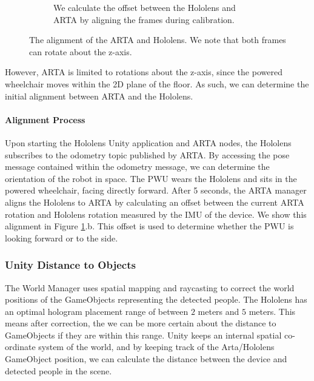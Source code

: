 \begin{figure}[ht]
\begin{subfigure}[b]{.45\textwidth}
		\caption{We calculate the offset between the Hololens and ARTA by aligning the frames during calibration.}
	\end{subfigure}
	\vspace{-1\baselineskip}
	\begin{center}
		\caption{The alignment of the ARTA and Hololens. We note that both frames can rotate about the z-axis.}
		\label{fig:holoArtaFrames}
	\end{center}
	\vspace{-2\baselineskip}
\end{figure}


However, ARTA is limited to rotations about the z-axis, since the powered wheelchair moves within the 2D plane of the floor. As such, we can determine the initial alignment between ARTA and the Hololens.

\paragraph{Alignment Process} Upon starting the Hololens Unity application and ARTA nodes, the Hololens subscribes to the odometry topic published by ARTA. By accessing the pose message contained within the odometry message, we can determine the orientation of the robot in space. The PWU wears the Hololens and sits in the powered wheelchair, facing directly forward. After 5 seconds, the ARTA manager aligns the Hololens to ARTA by calculating an offset between the current ARTA rotation and Hololens rotation measured by the IMU of the device. We show this alignment in Figure \ref{fig:holoArtaFrames}.b. This offset is used to determine whether the PWU is looking forward or to the side. 

\subsubsection{Unity Distance to Objects}
The World Manager uses spatial mapping and raycasting to correct the world positions of the GameObjects representing the detected people. The Hololens has an optimal hologram placement range of between $2$ meters and $5$ meters. This means after correction, the we can be more certain about the distance to GameObjects if they are within this range. Unity keeps an internal spatial co-ordinate system of the world, and by keeping track of the Arta/Hololens GameObject position, we can calculate the distance between the device and detected people in the scene.

